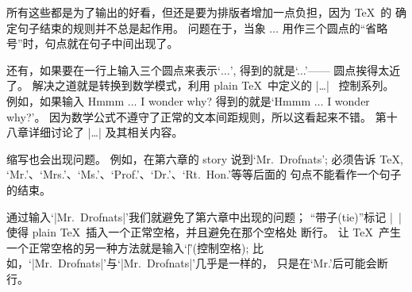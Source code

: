 所有这些都是为了输出的好看，但还是要为排版者增加一点负担，因为 \TeX\ 的%
确定句子结束的规则{并不总是起作用}。%
问题在于，当象 $\ldots$ 用作三个圆点的``省略号''时，句点就在句子中间出现了。

还有，如果要在一行上输入三个圆点来表示`$\ldots$', 得到的就是`...'——%
圆点挨得太近了。%
解决之道就是转换到{数学}模式，利用 plain \TeX\ 中定义的 |\ldots|~%
控制系列。%
例如，如果输入
\begintt
Hmmm $\ldots$ I wonder why?
\endtt
得到的就是`Hmmm $\ldots$ I wonder why?'。%
因为数学公式不遵守了正常的文本间距规则，所以这看起来不错。%
第十八章详细讨论了 |\ldots| 及其相关内容。

缩写也会出现问题。%
例如，在第六章的 story 说到`Mr.~{Drofnats}';
必须告诉 \TeX, `Mr.'、\allowbreak`Mrs.'、`Ms.'、`Prof.'、`Dr.'、`Rt.~Hon.'等等后面的%
句点不能看作一个句子的结束。

通过输入`|Mr.~Drofnats|'我们就避免了第六章中出现的问题；
``带子(tie)''标记 |~| 使得 plain \TeX\ 插入一个正常空格，并且避免在那个空格处%
断行。%
让 \TeX\ 产生一个正常空格的另一种方法就是输入`|\|\]'(控制空格);
比如，`|Mr.\ Drofnats|'与`|Mr.~Drofnats|'几乎是一样的，
只是在`Mr.'后可能会断行。

